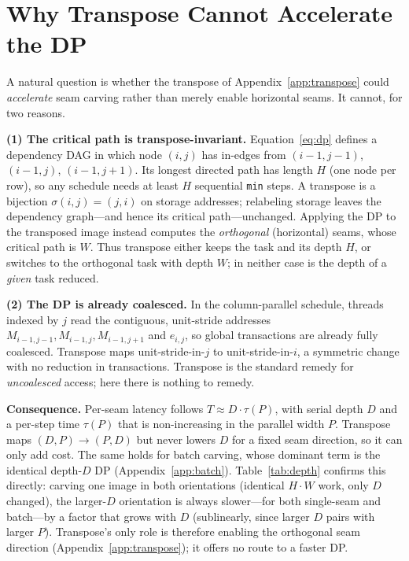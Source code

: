 \documentclass[conference]{IEEEtran}
\begin{document}


\section{Why Transpose Cannot Accelerate the DP}
\label{app:depth}
A natural question is whether the transpose of Appendix~\ref{app:transpose}
could \emph{accelerate} seam carving rather than merely enable horizontal seams.
It cannot, for two reasons.

\textbf{(1) The critical path is transpose-invariant.}
Equation~\eqref{eq:dp} defines a dependency DAG in which node $(i,j)$ has
in-edges from $(i{-}1,j{-}1)$, $(i{-}1,j)$, $(i{-}1,j{+}1)$. Its longest
directed path has length $H$ (one node per row), so any schedule needs at least
$H$ sequential \texttt{min} steps. A transpose is a bijection $\sigma(i,j){=}(j,i)$
on storage addresses; relabeling storage leaves the dependency graph---and hence
its critical path---unchanged. Applying the DP to the transposed image instead
computes the \emph{orthogonal} (horizontal) seams, whose critical path is $W$.
Thus transpose either keeps the task and its depth $H$, or switches to the
orthogonal task with depth $W$; in neither case is the depth of a \emph{given}
task reduced.

\textbf{(2) The DP is already coalesced.}
In the column-parallel schedule, threads indexed by $j$ read the contiguous,
unit-stride addresses $M_{i-1,j-1}, M_{i-1,j}, M_{i-1,j+1}$ and $e_{i,j}$, so global transactions
are already fully coalesced. Transpose maps unit-stride-in-$j$ to
unit-stride-in-$i$, a symmetric change with no reduction in transactions.
Transpose is the standard remedy for \emph{uncoalesced} access; here there is
nothing to remedy.

\textbf{Consequence.}
Per-seam latency follows $T \approx D\cdot\tau(P)$, with serial depth $D$ and a
per-step time $\tau(P)$ that is non-increasing in the parallel width $P$.
Transpose maps $(D,P){\to}(P,D)$ but never lowers $D$ for a fixed seam
direction, so it can only add cost. The same holds for batch carving, whose
dominant term is the identical depth-$D$ DP (Appendix~\ref{app:batch}).
Table~\ref{tab:depth} confirms this directly: carving one image in both
orientations (identical $H{\cdot}W$ work, only $D$ changed), the larger-$D$
orientation is always slower---for both single-seam and batch---by a factor that
grows with $D$ (sublinearly, since larger $D$ pairs with larger $P$).
Transpose's only role is therefore enabling the orthogonal seam direction
(Appendix~\ref{app:transpose}); it offers no route to a faster DP.
\end{document}

